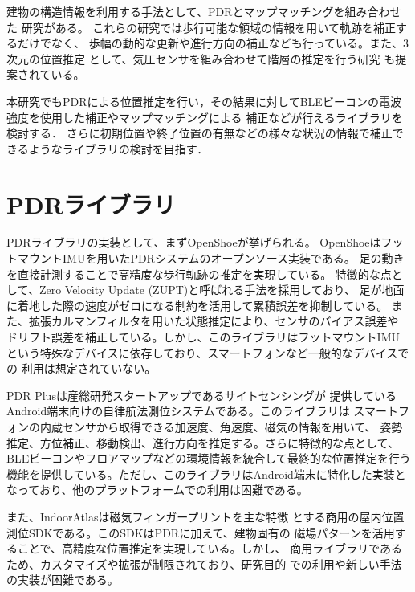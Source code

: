 建物の構造情報を利用する手法として、PDRとマップマッチングを組み合わせた
研究\cite{pdr-map}\cite{additional-map-matching-paper}がある。
これらの研究では歩行可能な領域の情報を用いて軌跡を補正するだけでなく、
歩幅の動的な更新や進行方向の補正なども行っている。また、3次元の位置推定
として、気圧センサを組み合わせて階層の推定を行う研究\cite{3d-pdr-paper}
も提案されている。

本研究でもPDRによる位置推定を行い，その結果に対してBLEビーコンの電波強度を使用した補正やマップマッチングによる
補正などが行えるライブラリを検討する．
さらに初期位置や終了位置の有無などの様々な状況の情報で補正できるようなライブラリの検討を目指す．


\section{PDRライブラリ}

PDRライブラリの実装として、まずOpenShoe\cite{openshoe}が挙げられる。
OpenShoeはフットマウントIMUを用いたPDRシステムのオープンソース実装である。
足の動きを直接計測することで高精度な歩行軌跡の推定を実現している。
特徴的な点として、Zero Velocity Update (ZUPT)と呼ばれる手法を採用しており、
足が地面に着地した際の速度がゼロになる制約を活用して累積誤差を抑制している。
また、拡張カルマンフィルタを用いた状態推定により、センサのバイアス誤差や
ドリフト誤差を補正している。しかし、このライブラリはフットマウントIMU
という特殊なデバイスに依存しており、スマートフォンなど一般的なデバイスでの
利用は想定されていない。

PDR Plus\cite{pdr-plus}は産総研発スタートアップであるサイトセンシングが
提供しているAndroid端末向けの自律航法測位システムである。このライブラリは
スマートフォンの内蔵センサから取得できる加速度、角速度、磁気の情報を用いて、
姿勢推定、方位補正、移動検出、進行方向を推定する。さらに特徴的な点として、
BLEビーコンやフロアマップなどの環境情報を統合して最終的な位置推定を行う
機能を提供している。ただし、このライブラリはAndroid端末に特化した実装と
なっており、他のプラットフォームでの利用は困難である。

また、IndoorAtlas\cite{indoor-atlas}は磁気フィンガープリントを主な特徴
とする商用の屋内位置測位SDKである。このSDKはPDRに加えて、建物固有の
磁場パターンを活用することで、高精度な位置推定を実現している。しかし、
商用ライブラリであるため、カスタマイズや拡張が制限されており、研究目的
での利用や新しい手法の実装が困難である。

